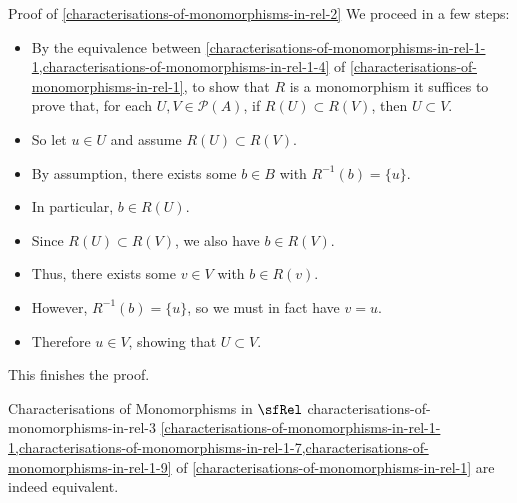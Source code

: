 \begin{Proof}{Proof of \cref{characterisations-of-monomorphisms-in-rel-2}}
    We proceed in a few steps:
    \begin{itemize}
        \item By the equivalence between \cref{characterisations-of-monomorphisms-in-rel-1-1,characterisations-of-monomorphisms-in-rel-1-4} of \cref{characterisations-of-monomorphisms-in-rel-1}, to show that $R$ is a monomorphism it suffices to prove that, for each $U,V\in\mathcal{P}(A)$, if $R(U)\subset R(V)$, then $U\subset V$.
        \item So let $u\in U$ and assume $R(U)\subset R(V)$.
        \item By assumption, there exists some $b\in B$ with $R^{-1}(b)=\{u\}$.
        \item In particular, $b\in R(U)$.
        \item Since $R(U)\subset R(V)$, we also have $b\in R(V)$.
        \item Thus, there exists some $v\in V$ with $b\in R(v)$.
        \item However, $R^{-1}(b)=\{u\}$, so we must in fact have $v=u$.
        \item Therefore $u\in V$, showing that $U\subset V$.
    \end{itemize}
    This finishes the proof.
\end{Proof}
\begin{corollary}{Characterisations of Monomorphisms in $\sfRel$ \rmIII}{characterisations-of-monomorphisms-in-rel-3}%
    \cref{characterisations-of-monomorphisms-in-rel-1-1,characterisations-of-monomorphisms-in-rel-1-7,characterisations-of-monomorphisms-in-rel-1-9} of \cref{characterisations-of-monomorphisms-in-rel-1} are indeed equivalent.%
\end{corollary}
